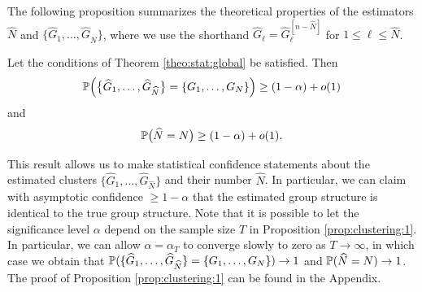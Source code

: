 \documentclass[a4paper,12pt]{article}
\begin{document}
\newpage
The following proposition summarizes the theoretical properties of the estimators $\widehat{N}$ and $\{ \widehat{G}_1,\ldots,\widehat{G}_{\widehat{N}} \}$, where we use the shorthand $\widehat{G}_\ell = \widehat{G}_\ell^{[n-\widehat{N}]}$ for $1 \le \ell \le \widehat{N}$. 
\begin{prop}\label{prop:clustering:1}
Let the conditions of Theorem \ref{theo:stat:global} be satisfied. Then 
\[ \mathbb{P} \Big( \big\{ \widehat{G}_1,\ldots,\widehat{G}_{\widehat{N}} \big\} = \{ G_1,\ldots,G_N \} \Big) \ge (1-\alpha) + o(1) \]
and 
\[ \mathbb{P} \big( \widehat{N} = N \big) \ge (1-\alpha) + o(1). \]
\end{prop}
This result allows us to make statistical confidence statements about the estimated clusters $\{ \widehat{G}_1,\ldots,\widehat{G}_{\widehat{N}} \}$ and their number $\widehat{N}$. In particular, we can claim with asymptotic confidence $\ge 1 - \alpha$ that the estimated group structure is identical to the true group structure. Note that it is possible to let the significance level $\alpha$ depend on the sample size $T$ in Proposition \ref{prop:clustering:1}. In particular, we can allow $\alpha = \alpha_T$ to converge slowly to zero as $T \rightarrow \infty$, in which case we obtain that $\mathbb{P} ( \{ \widehat{G}_1,\ldots,\widehat{G}_{\widehat{N}} \} = \{ G_1,\ldots,G_N \} ) \rightarrow 1$ and $\mathbb{P} ( \widehat{N} = N ) \rightarrow 1$. The proof of Proposition \ref{prop:clustering:1} can be found in the Appendix.
\end{document}
